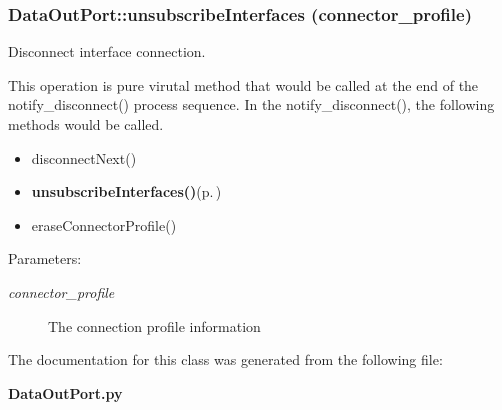 \subsubsection{\setlength{\rightskip}{0pt plus 5cm}Data\-Out\-Port::unsubscribe\-Interfaces (connector\_\-profile)}\label{classDataOutPort_DataOutPorta4}


Disconnect interface connection. 

This operation is pure virutal method that would be called at the end of the notify\_\-disconnect() process sequence. In the notify\_\-disconnect(), the following methods would be called.\begin{itemize}
\item disconnect\-Next()\item {\bf unsubscribe\-Interfaces()}{\rm (p.\,\pageref{classDataOutPort_DataOutPorta4})}\item erase\-Connector\-Profile()\end{itemize}


\begin{Desc}
\item[Parameters:]
\begin{description}
\item[{\em connector\_\-profile}]The connection profile information\end{description}
\end{Desc}


The documentation for this class was generated from the following file:\begin{CompactItemize}
\item 
{\bf Data\-Out\-Port.py}\end{CompactItemize}
